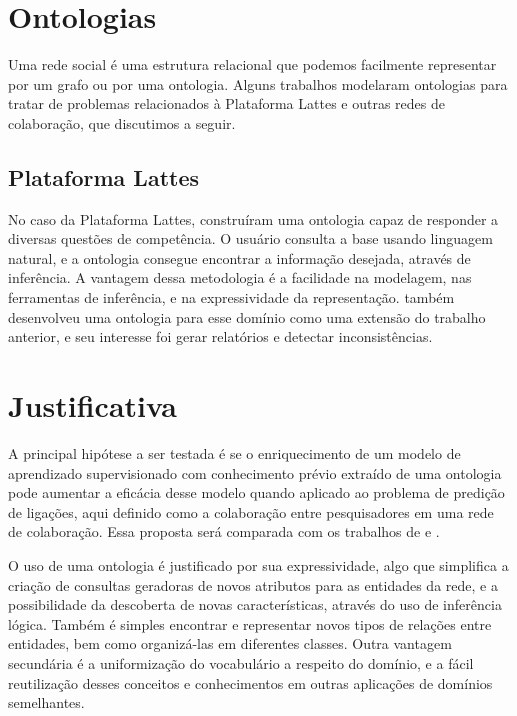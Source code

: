 \section{Ontologias}
\label{sec:ontologias}

Uma rede social é uma estrutura relacional que podemos facilmente representar por um grafo ou por uma ontologia. Alguns trabalhos modelaram ontologias para tratar de problemas relacionados à Plataforma Lattes e outras redes de colaboração, que discutimos a seguir.


\subsection{Plataforma Lattes}
\label{ssec:lattes}

No caso da Plataforma Lattes, \citet{Anaue2009} construíram uma ontologia capaz de responder a diversas questões de competência. O usuário consulta a base usando linguagem natural, e a ontologia consegue encontrar a informação desejada, através de inferência. A vantagem dessa metodologia é a facilidade na modelagem, nas ferramentas de inferência, e na
expressividade da representação. \citet{Galego2013} também desenvolveu uma ontologia para esse domínio como uma extensão do trabalho anterior, e seu interesse foi gerar relatórios e detectar inconsistências.

\section{Justificativa}
\label{sec:justificativa}

A principal hipótese a ser testada é se o enriquecimento de um modelo de aprendizado supervisionado com conhecimento prévio extraído de uma ontologia pode aumentar a eficácia desse modelo quando aplicado ao problema de predição de ligações, aqui definido como a colaboração entre pesquisadores em uma rede de colaboração. Essa proposta será comparada com os trabalhos de \citet{MohammadAlHasan} e \cite{Cervantes2014}.

O uso de uma ontologia é justificado por sua expressividade, algo que simplifica a criação de consultas geradoras de novos atributos para as entidades da rede, e a possibilidade da descoberta de novas características, através do uso de inferência lógica. Também é simples encontrar e representar novos tipos de relações entre entidades, bem como organizá-las em diferentes classes. Outra vantagem secundária é a uniformização do vocabulário a respeito do domínio, e a fácil reutilização desses conceitos e conhecimentos em outras aplicações de domínios semelhantes.

